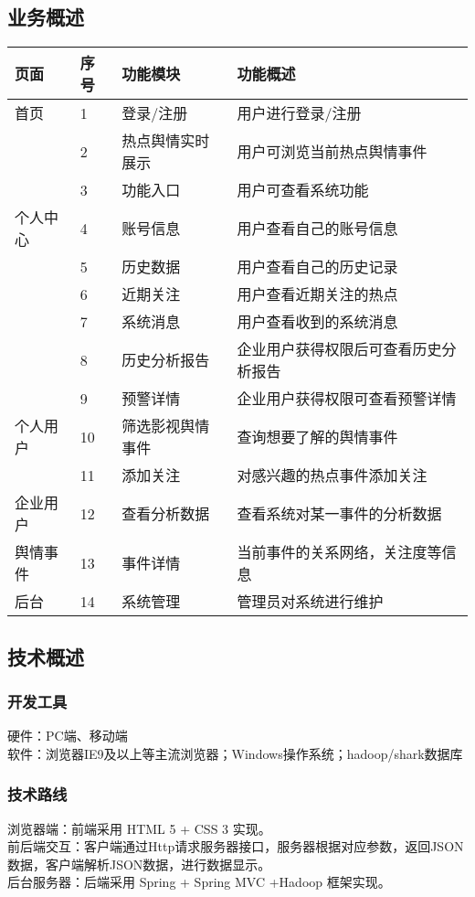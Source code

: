 \subsection{业务概述}
\begin{table}
    \centering
    \begin{tabular}{|l|l|l|l|}
    \hline
        页面 & 序号 & 功能模块 & 功能概述 \\ \hline
        首页 & 1 & 登录/注册 & 用户进行登录/注册 \\ \hline
         & 2 & 热点舆情实时展示 & 用户可浏览当前热点舆情事件 \\ \hline
         & 3 & 功能入口 & 用户可查看系统功能 \\ \hline
        个人中心 & 4 & 账号信息 & 用户查看自己的账号信息 \\ \hline
         & 5 & 历史数据 & 用户查看自己的历史记录 \\ \hline
         & 6 & 近期关注 & 用户查看近期关注的热点 \\ \hline
         & 7 & 系统消息 & 用户查看收到的系统消息 \\ \hline
         & 8 & 历史分析报告 & 企业用户获得权限后可查看历史分析报告 \\ \hline
         & 9 & 预警详情 & 企业用户获得权限可查看预警详情 \\ \hline
        个人用户 & 10 & 筛选影视舆情事件 & 查询想要了解的舆情事件 \\ \hline
         & 11 & 添加关注 & 对感兴趣的热点事件添加关注 \\ \hline
        企业用户 & 12 & 查看分析数据 & 查看系统对某一事件的分析数据 \\ \hline
        舆情事件 & 13 & 事件详情 & 当前事件的关系网络，关注度等信息 \\ \hline
        后台 & 14 & 系统管理 & 管理员对系统进行维护 \\ \hline
    \end{tabular}
\end{table}

\subsection{技术概述}
\subsubsection{开发工具}
硬件：PC端、移动端
\\软件：浏览器IE9及以上等主流浏览器；Windows操作系统；hadoop/shark数据库
\subsubsection{技术路线}
浏览器端：前端采用 HTML 5 + CSS 3 实现。
\\前后端交互：客户端通过Http请求服务器接口，服务器根据对应参数，返回JSON数据，客户端解析JSON数据，进行数据显示。
\\后台服务器：后端采用 Spring + Spring MVC +Hadoop 框架实现。